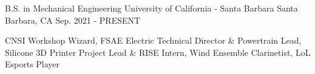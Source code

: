 


\begin{cventries}

\cventry
{B.S. in Mechanical Engineering} %
{University of California - Santa Barbara} %
{Santa Barbara, CA} %
{Sep. 2021 - PRESENT} %
{ %
\begin{cvitems}
\item {CNSI Workshop Wizard, FSAE Electric Technical Director \& Powertrain Lead, Silicone 3D Printer Project Lead \& RISE Intern, Wind Ensemble Clarinetist, LoL Esports Player}
\end{cvitems}
}





\end{cventries}